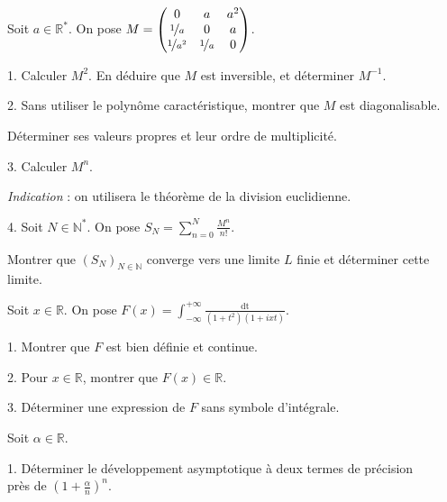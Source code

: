 \noindent Soit $a \in \mathbb{R}^*$. On pose $\displaystyle M = 
\begin{pmatrix}
0                 & a               & a^2\\
\nicefrac{1}{a}   & 0               & a  \\
\nicefrac{1}{a^2} & \nicefrac{1}{a} & 0  \\
\end{pmatrix}
$.

\vspace{5pt}
1. Calculer $M^2$. En déduire que $M$ est inversible, et déterminer $M^{-1}$.

\vspace{5pt}
2. Sans utiliser le polynôme caractéristique, montrer que $M$ est diagonalisable.

Déterminer ses valeurs propres et leur ordre de multiplicité.

\vspace{5pt}
3. Calculer $M^n$.

\textit{Indication} : on utilisera le théorème de la division euclidienne.

\vspace{5pt}
4. Soit $N \in \mathbb{N}^*$. On pose $\displaystyle S_N = \sum_{n=0}^{N} \frac{M^n}{n!}$.

Montrer que $(S_N)_{N \in \mathbb{N}}$ converge vers une limite $L$ finie et déterminer cette limite.



\subetoiles



\noindent Soit $x \in \mathbb{R}$.
On pose $\displaystyle F(x) = \int_{-\infty}^{+\infty} \frac {\mathrm{dt}} {(1+t^2)(1+ixt)}$.

\vspace{5pt}
1. Montrer que $F$ est bien définie et continue.

\vspace{5pt}
2. Pour $x \in \mathbb{R}$, montrer que $F(x) \in \mathbb{R}$.

\vspace{5pt}
3. Déterminer une expression de $F$ sans symbole d'intégrale.



\subetoiles
\columnbreak



\noindent Soit $\alpha\in \mathbb{R}$.

\vspace{5pt}
1. Déterminer le développement asymptotique à deux termes de précision \\ près de
$\displaystyle \left( 1 + \frac {\alpha} {n}\right)^n$.

